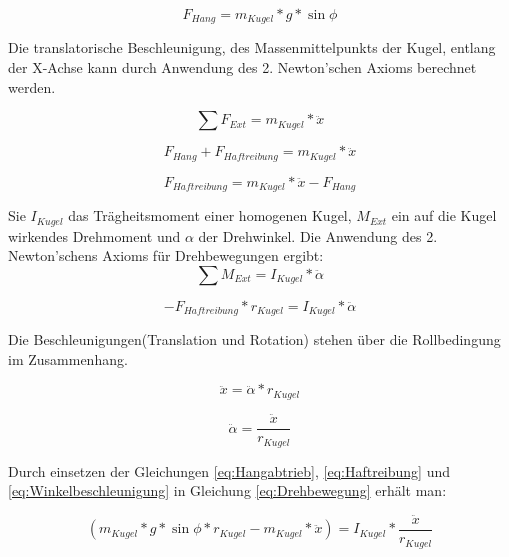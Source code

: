 \documentclass[12pt,a4paper,bibliography=totoc,listof=totoc]{scrartcl}
\begin{document}
\begin{equation} 
F_{Hang} = m_{Kugel} * g * \sin\phi
\label{eq:Hangabtrieb}
\end{equation}

Die translatorische Beschleunigung, des Massenmittelpunkts der Kugel, entlang der X-Achse kann durch Anwendung des 2. Newton'schen Axioms berechnet werden.

\begin{equation} 
\sum{F_{Ext}} = m_{Kugel} * \ddot{x}
\end{equation}

\begin{equation} 
F_{Hang} + F_{Haftreibung} = m_{Kugel} * \ddot{x}
\end{equation}

\begin{equation} 
F_{Haftreibung} = m_{Kugel} * \ddot{x} - F_{Hang}
\label{eq:Haftreibung} 
\end{equation}

Sie \(I_{Kugel}\) das Trägheitsmoment einer homogenen Kugel, \(M_{Ext}\) ein auf die Kugel wirkendes Drehmoment  und \(\alpha\) der Drehwinkel. Die Anwendung des 2. Newton'schens Axioms für Drehbewegungen ergibt:
\begin{equation} 
\sum{M_{Ext}} = I_{Kugel} * \ddot{\alpha}
\end{equation}

\begin{equation} 
-F_{Haftreibung} * r_{Kugel} = I_{Kugel} * \ddot{\alpha}
\label{eq:Drehbewegung}
\end{equation}

Die Beschleunigungen(Translation und Rotation) stehen über die Rollbedingung im Zusammenhang.

\begin{equation} 
\ddot{x} = \ddot{\alpha} * r_{Kugel}
\end{equation}

\begin{equation} 
\ddot{\alpha} = \frac{\ddot{x}}{r_{Kugel}}
\label{eq:Winkelbeschleunigung}
\end{equation}

Durch einsetzen der Gleichungen \ref{eq:Hangabtrieb}, \ref{eq:Haftreibung} und \ref{eq:Winkelbeschleunigung} in Gleichung \ref{eq:Drehbewegung} erhält man:

\begin{equation} 
(m_{Kugel} *  g *\sin\phi * r_{Kugel} - m_{Kugel} * \ddot{x}) = I_{Kugel} * \frac{\ddot{x}}{r_{Kugel}}
\end{equation}
\end{document}
